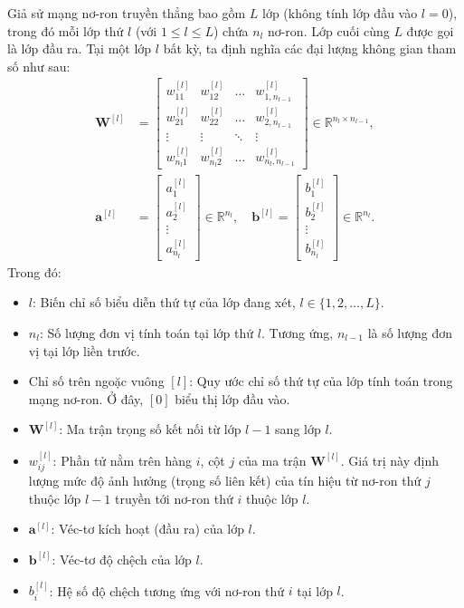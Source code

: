 Giả sử mạng nơ-ron truyền thẳng bao gồm $L$ lớp (không tính lớp đầu vào $l=0$), trong đó mỗi lớp thứ $l$ (với $1 \le l \le L$) chứa $n_l$ nơ-ron. Lớp cuối cùng $L$ được gọi là lớp đầu ra. Tại một lớp $l$ bất kỳ, ta định nghĩa các đại lượng không gian tham số như sau:
\begin{equation}
\begin{aligned}
    \mathbf{W}^{[l]} &= \begin{bmatrix}
        w_{11}^{[l]} & w_{12}^{[l]} & \dots & w_{1, n_{l-1}}^{[l]} \\
        w_{21}^{[l]} & w_{22}^{[l]} & \dots & w_{2, n_{l-1}}^{[l]} \\
        \vdots & \vdots & \ddots & \vdots \\
        w_{n_l 1}^{[l]} & w_{n_l 2}^{[l]} & \dots & w_{n_l, n_{l-1}}^{[l]}
    \end{bmatrix} \in \mathbb{R}^{n_l \times n_{l-1}}, \\
    \mathbf{a}^{[l]} &= \begin{bmatrix} a_1^{[l]} \\ a_2^{[l]} \\ \vdots \\ a_{n_l}^{[l]} \end{bmatrix} \in \mathbb{R}^{n_l}, \quad
    \mathbf{b}^{[l]} = \begin{bmatrix} b_1^{[l]} \\ b_2^{[l]} \\ \vdots \\ b_{n_l}^{[l]} \end{bmatrix} \in \mathbb{R}^{n_l}.
\end{aligned}
\end{equation}
Trong đó:
\begin{itemize}
    \item $l$: Biến chỉ số biểu diễn thứ tự của lớp đang xét, $l \in \{1, 2, \dots, L\}$.
    \item $n_l$: Số lượng đơn vị tính toán tại lớp thứ $l$. Tương ứng, $n_{l-1}$ là số lượng đơn vị tại lớp liền trước.
    \item Chỉ số trên ngoặc vuông $[l]$: Quy ước chỉ số thứ tự của lớp tính toán trong mạng nơ-ron. Ở đây, $[0]$ biểu thị lớp đầu vào.
    \item $\mathbf{W}^{[l]}$: Ma trận trọng số kết nối từ lớp $l-1$ sang lớp $l$.
    \item $w_{ij}^{[l]}$: Phần tử nằm trên hàng $i$, cột $j$ của ma trận $\mathbf{W}^{[l]}$. Giá trị này định lượng mức độ ảnh hưởng (trọng số liên kết) của tín hiệu từ nơ-ron thứ $j$ thuộc lớp $l-1$ truyền tới nơ-ron thứ $i$ thuộc lớp $l$.
    \item $\mathbf{a}^{[l]}$: Véc-tơ kích hoạt (đầu ra) của lớp $l$.
    \item $\mathbf{b}^{[l]}$: Véc-tơ độ chệch của lớp $l$.
    \item $b_i^{[l]}$: Hệ số độ chệch tương ứng với nơ-ron thứ $i$ tại lớp $l$.
\end{itemize}
